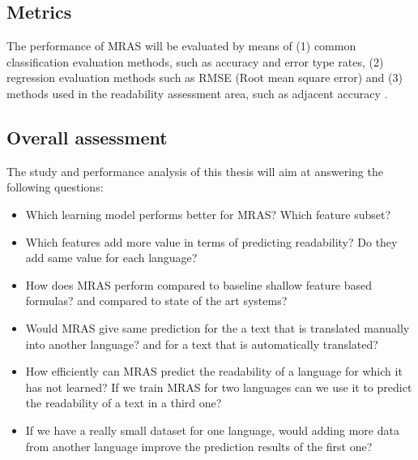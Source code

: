 \documentclass[12pt]{article}
\begin{document}

\subsection{Metrics}
The performance of MRAS will be evaluated by means of (1) common classification evaluation methods, such as accuracy and error type rates, (2) regression evaluation methods such as RMSE (Root mean square error) and (3) methods used in the readability assessment area, such as adjacent accuracy \cite{franccois2012ai}. 

\subsection{Overall assessment}
The study and performance analysis of this thesis will aim at answering the following questions:
\begin{itemize}

\item Which learning model performs better for MRAS? Which feature subset?
\item Which features add more value in terms of predicting readability? Do they add same value for each language?
\item How does MRAS perform compared to baseline shallow feature based formulas? and compared to state of the art systems?
\item Would MRAS give same prediction for the a text that is translated manually into another language? and for a text that is automatically translated?
\item How efficiently can MRAS predict the readability of a language for which it has not learned? If we train MRAS for two languages can we use it to predict the readability of a text in a third one?
\item If we have a really small dataset for one language, would adding more data from another language improve the prediction results of the first one?

\end{itemize}
\end{document}

